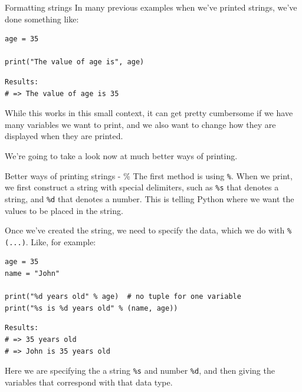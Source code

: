 \documentclass[10pt]{beamer}
\begin{document}
\begin{frame}[label={sec:org4b1d699},fragile]{Formatting strings}
 In many previous examples when we've printed strings, we've done something like:

\begin{verbatim}
age = 35

print("The value of age is", age)
\end{verbatim}

\begin{verbatim}
Results: 
# => The value of age is 35
\end{verbatim}


While this works in this small context, it can get pretty cumbersome if we have many
variables we want to print, and we also want to change how they are displayed when
they are printed.

We're going to take a look now at much better ways of printing.
\end{frame}

\begin{frame}[label={sec:orga48d893},fragile]{Better ways of printing strings - \%}
 The first method is using \texttt{\%}. When we print, we first construct a string with special
delimiters, such as \texttt{\%s} that denotes a string, and \texttt{\%d} that denotes a number. This is
telling Python where we want the values to be placed in the string.

Once we've created the string, we need to specify the data, which we do with \texttt{\%
(...)}. Like, for example:

\begin{verbatim}
age = 35
name = "John"

print("%d years old" % age)  # no tuple for one variable
print("%s is %d years old" % (name, age)) 
\end{verbatim}

\begin{verbatim}
Results: 
# => 35 years old
# => John is 35 years old
\end{verbatim}


Here we are specifying the a string \texttt{\%s} and number \texttt{\%d}, and then giving the variables
that correspond with that data type.
\end{frame}
\end{document}
